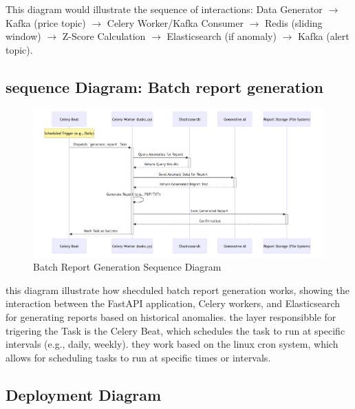 This diagram would illustrate the sequence of interactions: Data Generator $\rightarrow$ Kafka (price topic) $\rightarrow$ Celery Worker/Kafka Consumer $\rightarrow$ Redis (sliding window) $\rightarrow$ Z-Score Calculation $\rightarrow$ Elasticsearch (if anomaly) $\rightarrow$ Kafka (alert topic).

\break





\subsection{sequence Diagram: Batch report generation}
\begin{figure}[H]
    
    \includegraphics[width=1.2\textwidth]{figures/batch-1.png}
    \caption{Batch Report Generation Sequence Diagram}
    \label{fig:batch_report_generation_sequence_diagram}


\end{figure}


this diagram illustrate how shecduled batch report generation works, showing the interaction between the FastAPI application, Celery workers, and Elasticsearch for generating reports based on historical anomalies.
the layer responsibble for trigering the Task is the Celery Beat, which schedules the task to run at specific intervals (e.g., daily, weekly).
they work based on the linux cron system, which allows for scheduling tasks to run at specific times or intervals.




\subsection{Deployment Diagram}

